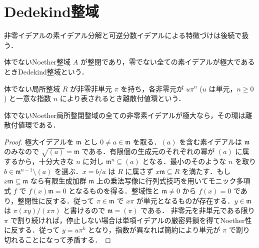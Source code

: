 \section{Dedekind整域}
非零イデアルの素イデアル分解と可逆分数イデアルによる特徴づけは後続で扱う．
\begin{defn}[Dedekind整域]
体でないNoether整域 $A$ が整閉であり，零でない全ての素イデアルが極大であるときDedekind整域という．
\end{defn}
\begin{defn}[離散付値環]
体でない局所整域 $R$ が非零非単元 $\pi$ を持ち，各非零元が $u\pi^n$ ($u$ は単元，$n\geq0$) と一意な指数 $n$ により表されるとき離散付値環という．
\end{defn}
\begin{prop}[局所Noether整閉一次元整域]
体でないNoether局所整閉整域の全ての非零素イデアルが極大なら，その環は離散付値環である．
\end{prop}
\begin{proof}
極大イデアルを $\mathfrak m$ とし $0\ne a\in\mathfrak m$ を取る．$(a)$ を含む素イデアルは $\mathfrak m$ のみなので $\sqrt{(a)}=\mathfrak m$ である．有限個の生成元のそれぞれの冪が $(a)$ に属するから，十分大きな $n$ に対し $\mathfrak m^n\subseteq(a)$ となる．最小のそのような $n$ を取り $b\in\mathfrak m^{n-1}\setminus(a)$ を選ぶ．$x=b/a$ は $R$ に属さず $x\mathfrak m\subseteq R$ を満たす．もし $x\mathfrak m\subseteq\mathfrak m$ なら有限生成加群 $\mathfrak m$ 上の乗法写像に行列式技巧を用いてモニック多項式 $f$ で $f(x)\mathfrak m=0$ となるものを得る．整域性と $\mathfrak m\ne0$ から $f(x)=0$ であり，整閉性に反する．従って $\pi\in\mathfrak m$ で $x\pi$ が単元となるものが存在する．$y\in\mathfrak m$ は $\pi(xy)/(x\pi)$ と書けるので $\mathfrak m=(\pi)$ である．
非零元を非単元である限り $\pi$ で割り続ければ，停止しない場合は単項イデアルの厳密昇鎖を得てNoether性に反する．従って $y=u\pi^k$ となり，指数が異なれば簡約により単元が $\pi$ で割り切れることになって矛盾する．
\end{proof}
